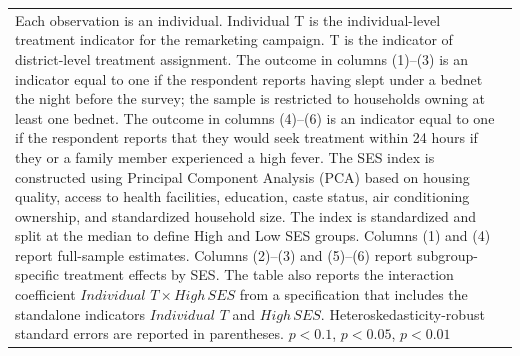 {{\begin{tabular}{l*{6}{c}}
\multicolumn{7}{p{0.95\linewidth}}{\scriptsize Each observation is an individual. Individual T is the individual-level treatment indicator for the remarketing campaign. T is the indicator of district-level treatment assignment. The outcome in columns (1)--(3) is an indicator equal to one if the respondent reports having slept under a bednet the night before the survey; the sample is restricted to households owning at least one bednet. The outcome in columns (4)--(6) is an indicator equal to one if the respondent reports that they would seek treatment within 24 hours if they or a family member experienced a high fever. The SES index is constructed using Principal Component Analysis (PCA) based on housing quality, access to health facilities, education, caste status, air conditioning ownership, and standardized household size. The index is standardized and split at the median to define High and Low SES groups. Columns (1) and (4) report full-sample estimates. Columns (2)--(3) and (5)--(6) report subgroup-specific treatment effects by SES. The table also reports the interaction coefficient \(Individual \,\, T \times High\,SES\) from a specification that includes the standalone indicators \(Individual \,\, T\) and \(High\,SES\).  Heteroskedasticity-robust standard errors are reported in parentheses.  \sym{*} \(p<0.1\), \sym{**} \(p<0.05\), \sym{***} \(p<0.01\)}\\
\end{tabular}
}%

}
